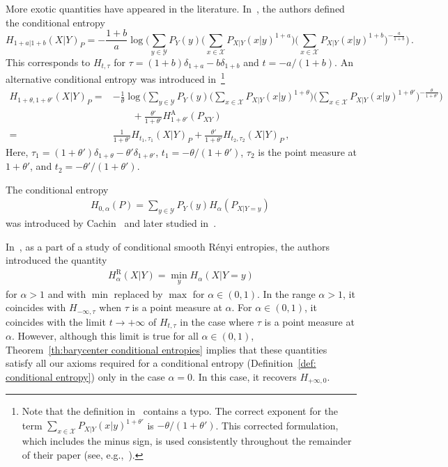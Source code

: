 \documentclass[aps,pra,11pt,onecolumn,nofootinbib,tightenlines]{revtex4-2}
\theoremstyle{definition}
\newcommand{\X}{\mathcal{X}}
\newcommand{\Y}{\mathcal{Y}}
\newcommand{\mc}[1]{\mathcal{#1}}
\begin{document}
More exotic quantities have appeared in the literature. In~\cite{tan2018conditional}, the authors defined the conditional entropy
\begin{equation}
    H_{1+a|1+b}(X|Y)_P=-\frac{1+b}{a}\log{\bigg(\sum_{y \in \Y} P_Y(y)\Big(\sum_{x \in \X} P_{X|Y}(x|y)^{1+a}\Big)\Big(\sum_{x \in \X} P_{X|Y}(x|y)^{1+b}\Big)^{-\frac{a}{1+b}}\bigg)} \,.
\end{equation}
This corresponds to $H_{t,\tau}$ for $\tau=(1+b)\delta_{1+a}-b\delta_{1+b}$ and $t=-a/(1+b)$.
An alternative conditional entropy was introduced in~\cite{hayashi2016uniform}\footnote{Note that the definition in~\cite[Equation (14)]{hayashi2016uniform} contains a typo. The correct exponent for the term $\sum_{x \in \X} P_{X|Y}(x|y)^{1+\theta'}$ is $-\theta/(1+\theta')$. This corrected formulation, which includes the minus sign, is used consistently throughout the remainder of their paper (see, e.g.,~\cite[Lemma 3, Property (11)]{hayashi2016uniform}).}
\begin{align}
    H_{1+\theta,1+\theta'}(X|Y)_P=&-\frac{1}{\theta}\log{\bigg(\sum_{y \in \Y} P_Y(y)\Big(\sum_{x \in \X} P_{X|Y}(x|y)^{1+\theta}\Big)\Big(\sum_{x \in \X} P_{X|Y}(x|y)^{1+\theta'}\Big)^{-\frac{\theta}{1+\theta'}}\bigg)} \\
    &\qquad + \frac{\theta'}{1+\theta'}H^{\text{A}}_{1+\theta'}(P_{XY}) \\
    =&\frac{1}{1+\theta'}H_{t_1,\tau_1}(X|Y)_P+\frac{\theta'}{1+\theta'}H_{t_2,\tau_2}(X|Y)_P\,,
\end{align}
Here, $\tau_1=(1+\theta')\delta_{1+\theta}-\theta'\delta_{1+\theta'}$, $t_1=-\theta/(1+\theta')$, $\tau_2$ is the point measure at $1+\theta'$, and $t_2=-\theta'/(1+\theta')$.

The conditional entropy
 \begin{align}
H_{0,\alpha}(P)=\sum_{y\in\mc Y} P_Y(y)H_\alpha(P_{X|Y=y})\,
 \end{align}
 was introduced by Cachin~\cite{cachin1997entropy} and later studied in~\cite{teixeira2012conditional}.

In~\cite{renner2005simple},
as a part of a study of conditional smooth R\'enyi entropies, the authors introduced the quantity
\begin{align}
    H^{\text{R}}_\alpha(X|Y) = \min _{y} H_\alpha(X|Y=y)
\end{align}
for $\alpha > 1$ and with $\min$ replaced by $\max$ for $\alpha \in (0,1)$. In the range $\alpha>1$, it coincides with $H_{-\infty,\tau}$ when $\tau$ is a point measure at $\alpha$.
For $\alpha \in (0,1)$, it coincides with the limit $t\rightarrow +\infty$ of $H_{t,\tau}$ in the case where $\tau$ is a point measure at $\alpha$. However, although this limit is true for all $\alpha \in (0,1)$, Theorem~\ref{th:barycenter conditional entropies} implies that these quantities satisfy all our axioms required for a conditional entropy  (Definition~\ref{def: conditional entropy}) only in the case $\alpha = 0$.
In this case, it recovers \(H_{+\infty,0}\).
\end{document}
